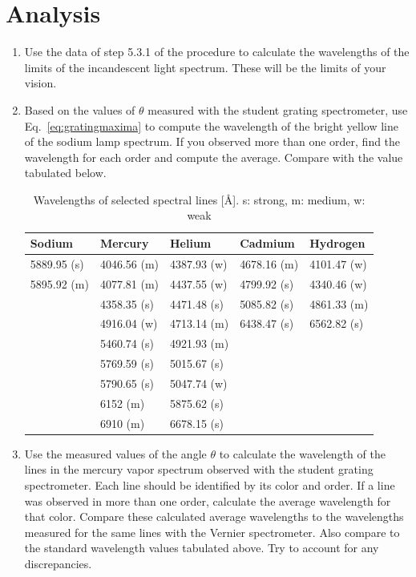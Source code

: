 \documentclass{article}
\begin{document}
\section{Analysis}

\begin{enumerate}
\item Use the data of step 5.3.1 of the procedure to calculate the
wavelengths of the limits of the incandescent light spectrum.  These
will be the limits of your vision.

\item Based on the values of ${\theta}$ measured with the student grating
spectrometer, use Eq.~\ref{eq:gratingmaxima} to compute the wavelength of the bright
yellow line of the sodium lamp spectrum.  If you observed more than
one order, find the wavelength for each order and compute the average.
 Compare with the value tabulated below.

\begin{table}
\begin{tabular}{ l | l | l | l | l}
  Sodium & Mercury & Helium & Cadmium & Hydrogen \\
\hline
5889.95 (s) & 4046.56 (m) & 4387.93 (w) & 4678.16 (m) & 4101.47 (w) \\
5895.92 (m) & 4077.81 (m) & 4437.55 (w) & 4799.92 (s) &  4340.46 (w)\\
		 & 4358.35 (s) & 4471.48 (s) & 5085.82 (s) & 4861.33 (m) \\
		 & 4916.04 (w) & 4713.14 (m) & 6438.47 (s) &  6562.82 (s)\\
		 & 5460.74 (s) & 4921.93 (m) &  & \\
		 & 5769.59 (s) & 5015.67 (s) &  & \\
		 & 5790.65 (s) & 5047.74 (w) &  & \\
		 & 6152    (m) & 5875.62 (s) &  & \\
		 & 6910    (m) & 6678.15 (s) &  & \\
\end{tabular}
\caption{Wavelengths of selected spectral lines [\AA].  s: strong, m: medium, w: weak}
\end{table}


\item Use the measured values of the angle ${\theta}$ to calculate the
wavelength of the lines in the mercury vapor spectrum observed with the
student grating spectrometer.  Each line should be identified by its
color and order. If a line was observed in more than one order,
calculate the average wavelength for that color.  Compare these
calculated average wavelengths to the wavelengths measured for the same
lines with the Vernier spectrometer.
Also compare to the standard wavelength values
tabulated above.  Try to account for any discrepancies.


\end{enumerate}
\end{document}
